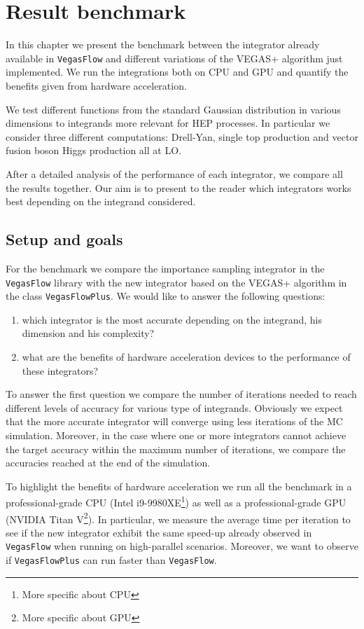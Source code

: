 \documentclass[../main/main.tex]{subfiles}
\begin{document}
\chapter{Result benchmark}
	
In this chapter we present the benchmark between the integrator already available in \texttt{VegasFlow} and different variations of the VEGAS+ algorithm just implemented. We run the integrations both on CPU and GPU and quantify the benefits given from hardware acceleration.

We test different functions from the standard Gaussian distribution in various dimensions to integrands more relevant for HEP processes. In particular we consider three different computations: Drell-Yan, single top production and vector fusion boson Higgs production all at LO.

After a detailed analysis of the performance of each integrator, we compare all the results together. Our aim is to present to the reader which integrators works best depending on the integrand considered.
\section{Setup and goals}
For the benchmark we compare the importance sampling integrator in the \texttt{VegasFlow} library with the new integrator based on the VEGAS+ algorithm  in the class \texttt{VegasFlowPlus}.
We would like to answer the following questions:
\begin{enumerate}
	\item which integrator is the most accurate depending on the integrand, his dimension and his complexity?
	\item what are the benefits of hardware acceleration devices to the performance of these integrators?
\end{enumerate}

To answer the first question we compare the number of iterations needed to reach different levels of accuracy for various type of integrands.
Obviously we expect that the more accurate integrator will converge using less iterations of the MC simulation. Moreover, in the case where one or more integrators cannot achieve the target accuracy within the maximum number of iterations, we compare the accuracies reached at the end of the simulation.

To highlight the benefits of hardware acceleration we run all the benchmark in a professional-grade CPU (Intel i9-9980XE\footnote{More specific about CPU}) as well as a professional-grade GPU (NVIDIA Titan V\footnote{More specific about GPU}). In particular, we measure the average time per iteration to see if the new integrator exhibit the same speed-up already observed in \texttt{VegasFlow} when running on 
high-parallel scenarios. Moreover, we want to observe if \texttt{VegasFlowPlus} can run faster than \texttt{VegasFlow}.
\end{document}
